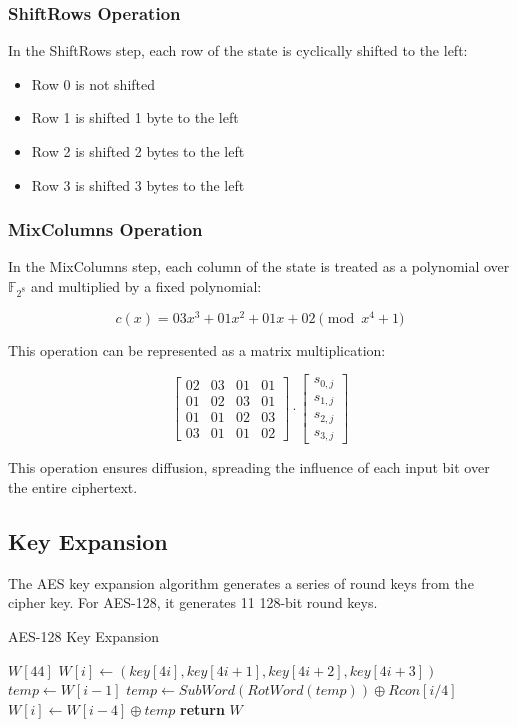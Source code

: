 \documentclass[11pt]{article}
\begin{document}
\subsubsection{ShiftRows Operation}

In the ShiftRows step, each row of the state is cyclically shifted to the left:
\begin{itemize}
    \item Row 0 is not shifted
    \item Row 1 is shifted 1 byte to the left
    \item Row 2 is shifted 2 bytes to the left
    \item Row 3 is shifted 3 bytes to the left
\end{itemize}

\subsubsection{MixColumns Operation}

In the MixColumns step, each column of the state is treated as a polynomial over $\mathbb{F}_{2^8}$ and multiplied by a fixed polynomial:

\[ c(x) = 03x^3 + 01x^2 + 01x + 02 \pmod{x^4 + 1} \]

This operation can be represented as a matrix multiplication:

\[
\begin{bmatrix}
02 & 03 & 01 & 01 \\
01 & 02 & 03 & 01 \\
01 & 01 & 02 & 03 \\
03 & 01 & 01 & 02
\end{bmatrix}
\cdot
\begin{bmatrix}
s_{0,j} \\
s_{1,j} \\
s_{2,j} \\
s_{3,j}
\end{bmatrix}
\]

This operation ensures diffusion, spreading the influence of each input bit over the entire ciphertext.

\subsection{Key Expansion}

The AES key expansion algorithm generates a series of round keys from the cipher key. For AES-128, it generates 11 128-bit round keys.

\begin{algorithm}
\caption{AES-128 Key Expansion}
\begin{algorithmic}[1]
    \State $W[44]$ 
        \State $W[i] \gets (key[4i], key[4i+1], key[4i+2], key[4i+3])$
    \EndFor
        \State $temp \gets W[i-1]$
            \State $temp \gets SubWord(RotWord(temp)) \oplus Rcon[i/4]$
        \EndIf
        \State $W[i] \gets W[i-4] \oplus temp$
    \EndFor
    \State \textbf{return} $W$
\EndProcedure
\end{algorithmic}
\end{algorithm}
\end{document}
